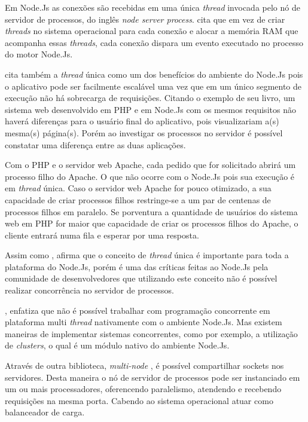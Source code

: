   Em Node.Js as conexões são recebidas em uma única \textit{thread} invocada pelo nó de servidor de processos, do inglês \textit{node server process}.
   cita que em vez de criar \textit{threads}
  no sistema operacional para cada conexão e alocar a memória RAM que acompanha essas \textit{threads}, 
  cada conexão dispara um evento executado no processo do motor Node.Js.
  
  
   cita também a \textit{thread} única como um dos benefícios do ambiente do Node.Js 
  pois o aplicativo pode ser facilmente escalável uma vez que em um único segmento de execução não há sobrecarga 
  de requisições. Citando o exemplo de seu livro, um sistema web desenvolvido em \ac{PHP} e em Node.Js com os mesmos requisitos
  não haverá diferenças para o usuário final do aplicativo, pois visualizariam a(s) mesma(s) página(s). Porém ao investigar 
  os processos no servidor é possível constatar uma diferença entre as duas aplicações.
  
  Com o \ac{PHP} e o servidor web Apache, cada pedido que for solicitado abrirá um processo filho do Apache. O que não ocorre 
  com o Node.Js pois sua execução é em \textit{thread} única.  Caso o servidor web Apache for pouco otimizado, a sua capacidade 
  de criar processos filhos restringe-se a um par de centenas de processos filhos em paralelo. Se porventura a quantidade 
  de usuários do sistema web em \ac{PHP} for maior que capacidade de criar os processos filhos do Apache, o cliente entrará 
  numa fila e esperar por uma resposta.\cite{Powers:2012}

  Assim como ,  afirma que o conceito de \textit{thread} única é importante para 
  toda a plataforma do Node.Js, porém é uma das críticas feitas ao Node.Js pela comunidade de desenvolvedores 
  que utilizando este conceito não é possível realizar concorrência no servidor de processos.
  
  , enfatiza que não é possível trabalhar com programação 
  concorrente em plataforma multi \textit{thread} nativamente com o ambiente Node.Js. Mas existem maneiras de implementar sistemas concorrentes, 
  como por exemplo, a utilização de \textit{clusters}, o qual é um módulo nativo do ambiente Node.Js.
  
  Através de outra biblioteca, \textit{multi-node} , é possível compartilhar sockets nos servidores.
  Desta maneira o nó de servidor de processos pode ser instanciado em um ou mais processadores, oferencendo paralelismo, 
  atendendo e recebendo requisições na mesma porta. Cabendo ao sistema operacional atuar como balanceador de carga.\cite{Oliveira:2012}
  
